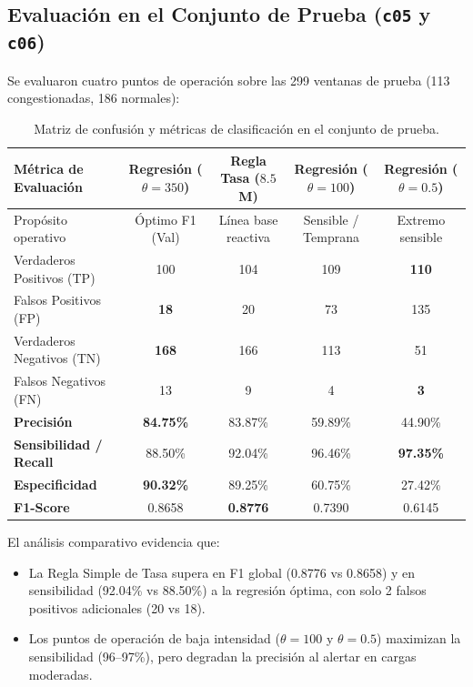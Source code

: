 \documentclass[11pt,a4paper]{article}
\begin{document}
\subsection{Evaluación en el Conjunto de Prueba (\texttt{c05} y \texttt{c06})}
Se evaluaron cuatro puntos de operación sobre las 299 ventanas de prueba (113 congestionadas, 186 normales):

\begin{table}[H]
\centering
\footnotesize
\caption{Matriz de confusión y métricas de clasificación en el conjunto de prueba.}
\label{tab:metricas_prueba}
\begin{tabularx}{\textwidth}{Xcccc}
\toprule
\textbf{Métrica de Evaluación} & \textbf{Regresión ($\theta = 350$)} & \textbf{Regla Tasa ($8.5$ M)} & \textbf{Regresión ($\theta = 100$)} & \textbf{Regresión ($\theta = 0.5$)} \\
\midrule
Propósito operativo & Óptimo F1 (Val) & Línea base reactiva & Sensible / Temprana & Extremo sensible \\
Verdaderos Positivos (TP) & 100 & 104 & 109 & \textbf{110} \\
Falsos Positivos (FP)     & \textbf{18} & 20 & 73 & 135 \\
Verdaderos Negativos (TN) & \textbf{168} & 166 & 113 & 51 \\
Falsos Negativos (FN)     & 13 & 9 & 4 & \textbf{3} \\
\midrule
\textbf{Precisión}        & \textbf{84.75\%} & 83.87\% & 59.89\% & 44.90\% \\
\textbf{Sensibilidad / Recall} & 88.50\% & 92.04\% & 96.46\% & \textbf{97.35\%} \\
\textbf{Especificidad}    & \textbf{90.32\%} & 89.25\% & 60.75\% & 27.42\% \\
\textbf{F1-Score}         & 0.8658 & \textbf{0.8776} & 0.7390 & 0.6145 \\
\bottomrule
\end{tabularx}
\end{table}

El análisis comparativo evidencia que:
\begin{itemize}
    \item La Regla Simple de Tasa supera en F1 global (0.8776 vs 0.8658) y en sensibilidad (92.04\% vs 88.50\%) a la regresión óptima, con solo 2 falsos positivos adicionales (20 vs 18).
    \item Los puntos de operación de baja intensidad ($\theta = 100$ y $\theta = 0.5$) maximizan la sensibilidad (96--97\%), pero degradan la precisión al alertar en cargas moderadas.
\end{itemize}
\end{document}
